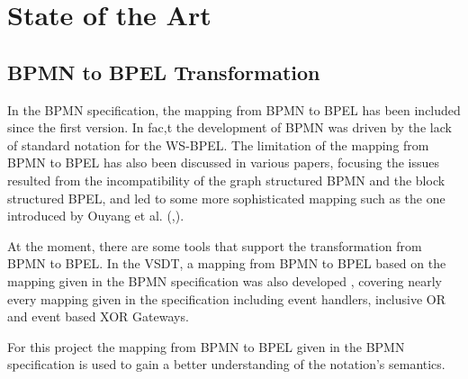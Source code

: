 \chapter{State of the Art}
\label{chap:sota}
\section{BPMN to BPEL Transformation}
In the BPMN specification, the mapping from BPMN to BPEL has been included since the first version. In fac,t the development of BPMN was driven by the lack of standard notation for the WS-BPEL\cite{weidlich2008}. The limitation of the mapping from BPMN to BPEL has also been discussed in various papers, focusing the issues resulted from the incompatibility of the graph structured BPMN and the block structured BPEL, and led to some more sophisticated mapping such as the one introduced by Ouyang et al. (\cite{Ouyang2006a},\cite{Ouyang2006b}).

At the moment, there are some tools that support the transformation from BPMN to BPEL. 
In the VSDT, a mapping from BPMN to BPEL based on the mapping given in the BPMN specification was also developed \cite{TK07}, covering nearly every mapping given in the specification including event handlers, inclusive OR and event based XOR Gateways. 

For this project the mapping from BPMN to BPEL given in the BPMN specification is used to gain a better understanding of the notation's semantics.


